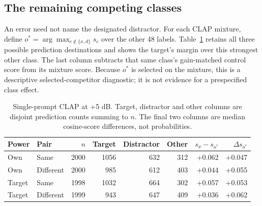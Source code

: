 \subsection{The remaining competing classes}
An error need not name the designated distractor. For each CLAP mixture, define
$o^*=\arg\max_{c\notin\{x,d\}}s_c$ over the other 48 labels.
Table~\ref{tab:other} retains all three possible prediction destinations and
shows the target's margin over this strongest other class. The last column
subtracts that same class's gain-matched control score from its mixture score.
Because $o^*$ is selected on the mixture, this is a descriptive selected-competitor
diagnostic; it is not evidence for a prespecified class effect.
\begin{table}[htbp]\centering\footnotesize
\caption{Single-prompt CLAP at +5 dB. Target, distractor and other columns are disjoint prediction counts summing to $n$. The final two columns are median cosine-score differences, not probabilities.}
\label{tab:other}\begin{tabular}{llrrrrrr}\toprule Power & Pair & $n$ & Target & Distractor & Other & $s_x-s_{o^*}$ & $\Delta s_{o^*}$\\\midrule
Own & Same & 2000 & 1056 & 632 & 312 & +0.062 & +0.047 \\
Own & Different & 2000 & 985 & 612 & 403 & +0.044 & +0.055 \\
Target & Same & 1998 & 1032 & 664 & 302 & +0.057 & +0.053 \\
Target & Different & 1999 & 943 & 647 & 409 & +0.036 & +0.062 \\
\bottomrule\end{tabular}\end{table}
